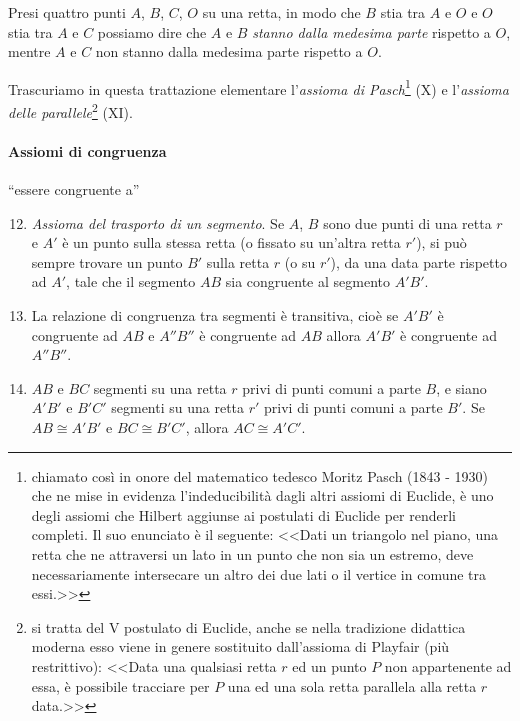 \begin{definizione}
Presi quattro punti \(A\), \(B\), \(C\), \(O\) su una retta, in modo che \(B\) 
stia tra \(A\) e \(O\) e \(O\) stia tra \(A\) e \(C\) possiamo dire che \(A\) e 
\(B\) \emph{stanno dalla medesima parte} rispetto a \(O\), mentre \(A\) e 
\(C\) non stanno dalla medesima parte rispetto a \(O\).
\end{definizione}
\begin{center}

\end{center}

\osservazione Trascuriamo in questa trattazione elementare 
l'\emph{assioma di Pasch}\footnote{chiamato così in onore del 
matematico tedesco Moritz Pasch (1843 - 1930) che ne mise in evidenza 
l'indeducibilità dagli altri assiomi di Euclide, è uno degli assiomi 
che Hilbert aggiunse ai postulati di Euclide per renderli completi. 
Il suo enunciato è il seguente: <<Dati un triangolo nel piano, una 
retta che ne attraversi un lato in un punto che non sia un estremo, 
deve necessariamente intersecare un altro dei due lati o il vertice 
in comune tra essi.>>} (X) e l'\emph{assioma delle 
parallele}\footnote{si tratta del V postulato di Euclide, anche se 
nella tradizione didattica moderna esso viene in genere sostituito 
dall'assioma di Playfair (più restrittivo): <<Data una qualsiasi 
retta \(r\) ed un punto \(P\) non appartenente ad essa, è possibile 
tracciare per \(P\) una ed una sola retta parallela alla retta \(r\) 
data.>>} (XI).

\paragraph{Assiomi di congruenza} ``essere congruente a''
\begin{enumerate}[label=\Roman{*}., nosep]
\setcounter{enumi}{11}
\item \emph{Assioma del trasporto di un segmento}. Se \(A\), \(B\) sono 
due punti di una retta \(r\) e \(A'\) è un punto sulla stessa retta (o 
fissato su un'altra retta \(r'\)), si può sempre trovare un punto \(B'\) 
sulla retta \(r\) (o su \(r'\)), da una data parte rispetto ad \(A'\), tale 
che il segmento \(AB\) sia congruente al segmento \(A'B'\). 
\begin{inaccessibleblock}
 \begin{center} \end{center}
\end{inaccessibleblock}
\item La relazione di congruenza tra segmenti è transitiva, cioè se 
\(A'B'\) è congruente ad \(AB\) e \(A''B''\) è congruente ad \(AB\) allora 
\(A'B'\) è congruente ad \(A''B''\).
\item \(AB\) e \(BC\) segmenti su una retta \(r\) privi di punti 
comuni a parte \(B\), e siano \(A'B'\) e \(B'C'\) segmenti su una retta 
\(r'\) privi di punti comuni a parte \(B'\). Se \(AB\cong A'B'\) e \(BC\cong 
B'C'\), allora  \(AC\cong A'C'\).
\end{enumerate}


